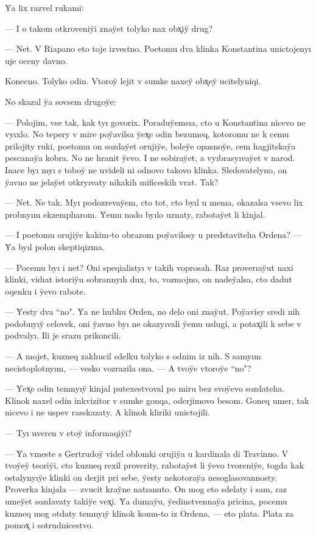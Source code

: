\documentclass[10pt]{book}
\begin{document}
Y̆a lix razvel rukami:

— I o takom otkroveniy̆i znay̆et tolyko nax obx̨iy̆ drug?

— Net. V Riapano eto toje izvestno. Poetomu dva klinka Konstantina unictojenyı uje oceny davno.

Konecno. Tolyko odin. Vtoroy̆ lejit v sumke naxey̆ obx̨ey̆ ucitelyniqi.

No skazal y̆a sovsem drugoy̆e:

— Polojim, vse tak, kak tyı govorix. Poraduy̆emsıa, cto u Konstantina nicevo ne vyıxlo. No tepery v mire poy̆avilsa y̆ex̨e odin bezumeq, kotoromu ne k cemu prilojity ruki, poetomu on sozday̆et orujiy̆e, boley̆e opasnoy̆e, cem hagjitskay̆a pescanay̆a kobra. No ne hranit y̆evo. I ne sobiray̆et, a vyıbrasyıvay̆et v narod. Inace byı myı s toboy̆ ne uvideli ni odnovo takovo klinka. Sledovatelyno, on y̆avno ne jelay̆et otkryıvaty nikakih mificeskih vrat. Tak?

— Net. Ne tak. Myı podozrevay̆em, cto tot, cto byıl u menıa, okazalsa vsevo lix probnyım ekzemplıarom. Y̆emu nado byılo uznaty, rabotay̆et li kinjal.

— I poetomu orujiy̆e kakim-to obrazom poy̆avilosy u predstavitelıa Ordena? — Y̆a byıl polon skeptiqizma.

— Pocemu byı i net? Oni speqialistyı v takih voprosah. Raz proverıay̆ut naxi klinki, vidıat istoriy̆u sobrannyıh dux, to, vozmojno, on nadey̆alsa, cto dadut oqenku i y̆evo rabote.

— Y̆esty dva ``no". Y̆a ne lıublıu Orden, no delo oni znay̆ut. Poy̆avisy sredi nih podobnyıy̆ celovek, oni y̆avno byı ne okazyıvali y̆emu uslugi, a potax̨ili k sebe v podvalyı. Ili je srazu prikoncili.

— A mojet, kuzneq zaklıucil sdelku tolyko s odnim iz nih. S samyım necistoplotnyım, — vesko vozrazila ona. — A tvoy̆e vtoroy̆e ``no"?

— Y̆ex̨e odin temnyıy̆ kinjal putexestvoval po miru bez svoy̆evo sozdatelıa. Klinok naxel odin inkvizitor v sumke gonqa, oderjimovo besom. Goneq umer, tak nicevo i ne uspev rasskazaty. A klinok kliriki unictojili.

— Tyı uveren v etoy̆ informaqiy̆i?

— Y̆a vmeste s Gertrudoy̆ videl oblomki orujiy̆a u kardinala di Travinno. V tvoy̆ey̆ teoriy̆i, cto kuzneq rexil proverity, rabotay̆et li y̆evo tvoreniy̆e, togda kak ostalynyıy̆e klinki on derjit pri sebe, y̆esty nekotoray̆a nesoglasovannosty. Proverka kinjala — zvucit kray̆ne natıanuto. On mog eto sdelaty i sam, raz umey̆et sozdavaty takiy̆e vex̨i. Y̆a dumay̆u, y̆edinstvennay̆a pricina, pocemu kuzneq mog otdaty temnyıy̆ klinok komu-to iz Ordena, — eto plata. Plata za pomox̨ i sotrudnicestvo.
\end{document}

